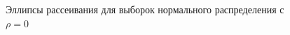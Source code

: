 \documentclass[12pt]{article}
\begin{document}
\begin{flushleft}
\begin{figure}[h]
\begin{minipage}[h]{0.325\linewidth}
            \end{minipage}
            \begin{minipage}[h]{0.325\linewidth}
            \end{minipage}
            \caption{Эллипсы рассеивания для выборок нормального распределения с $\rho = 0$}
            \label{rho_0}
            \end{figure}


\end{flushleft}
\end{document}
